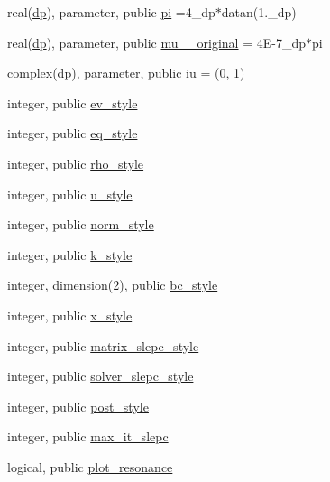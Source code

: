 \begin{DoxyCompactItemize}
\item 
real(\hyperlink{namespacenum__vars_a03802aa2bd86439d7a9370836fabf3f2}{dp}), parameter, public \hyperlink{namespacenum__vars_a26f47310576a3414135b3d3fcc079709}{pi} =4\+\_\+dp$\ast$datan(1.\+\_\+dp)
\item 
real(\hyperlink{namespacenum__vars_a03802aa2bd86439d7a9370836fabf3f2}{dp}), parameter, public \hyperlink{namespacenum__vars_a50e309ca1a5833d2838ed7457b7eb686}{mu\+\_\+\_\+original} = 4\+E-\/7\+\_\+dp$\ast$pi
\item 
complex(\hyperlink{namespacenum__vars_a03802aa2bd86439d7a9370836fabf3f2}{dp}), parameter, public \hyperlink{namespacenum__vars_a3b9303c24ebbdff7b366337702795211}{iu} = (0, 1)
\item 
integer, public \hyperlink{namespacenum__vars_aae749d5063afce3b912a097ff0993d00}{ev\+\_\+style}
\item 
integer, public \hyperlink{namespacenum__vars_a7d8763402037dbb80db19e2534ddf595}{eq\+\_\+style}
\item 
integer, public \hyperlink{namespacenum__vars_a787c23d10a522ff93cf555587b71cc0d}{rho\+\_\+style}
\item 
integer, public \hyperlink{namespacenum__vars_a5b3a837df1e82bb43fc47815c62c6b49}{u\+\_\+style}
\item 
integer, public \hyperlink{namespacenum__vars_acefc971404bce11e23308d5214d96d32}{norm\+\_\+style}
\item 
integer, public \hyperlink{namespacenum__vars_ac53a1bb8d91f2b753690456a340cfd44}{k\+\_\+style}
\item 
integer, dimension(2), public \hyperlink{namespacenum__vars_aabda06d22d0bad62383df3a0d977a82c}{bc\+\_\+style}
\item 
integer, public \hyperlink{namespacenum__vars_ad847b8c0cbf1e841c788bd657b40af5f}{x\+\_\+style}
\item 
integer, public \hyperlink{namespacenum__vars_addd869f9551067812954f8e24fe078b1}{matrix\+\_\+slepc\+\_\+style}
\item 
integer, public \hyperlink{namespacenum__vars_aff32519d88708f2f44f80d62cfb0e0f4}{solver\+\_\+slepc\+\_\+style}
\item 
integer, public \hyperlink{namespacenum__vars_a08dbb9f56d96f37c61cacb9d23d6e17f}{post\+\_\+style}
\item 
integer, public \hyperlink{namespacenum__vars_a8855ce3cc66743410c56c1dfecbc6a1a}{max\+\_\+it\+\_\+slepc}
\item 
logical, public \hyperlink{namespacenum__vars_a70fd85a310da008203347f25b0043238}{plot\+\_\+resonance}

\end{DoxyCompactItemize}
